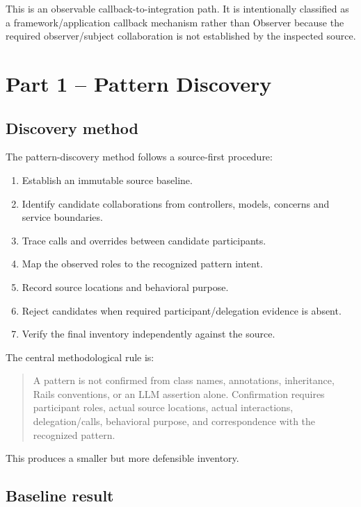 \documentclass[10pt,a4paper]{article}
\begin{document}
This is an observable callback-to-integration path. It is intentionally classified as a framework/application callback mechanism rather than Observer because the required observer/subject collaboration is not established by the inspected source.

\section{Part 1 -- Pattern Discovery}

\subsection{Discovery method}

The pattern-discovery method follows a source-first procedure:

\begin{enumerate}[leftmargin=*]
\item Establish an immutable source baseline.
\item Identify candidate collaborations from controllers, models, concerns and service boundaries.
\item Trace calls and overrides between candidate participants.
\item Map the observed roles to the recognized pattern intent.
\item Record source locations and behavioral purpose.
\item Reject candidates when required participant/delegation evidence is absent.
\item Verify the final inventory independently against the source.
\end{enumerate}

The central methodological rule is:

\begin{quote}
A pattern is not confirmed from class names, annotations, inheritance, Rails conventions, or an LLM assertion alone. Confirmation requires participant roles, actual source locations, actual interactions, delegation/calls, behavioral purpose, and correspondence with the recognized pattern.
\end{quote}

This produces a smaller but more defensible inventory.

\subsection{Baseline result}
\end{document}
